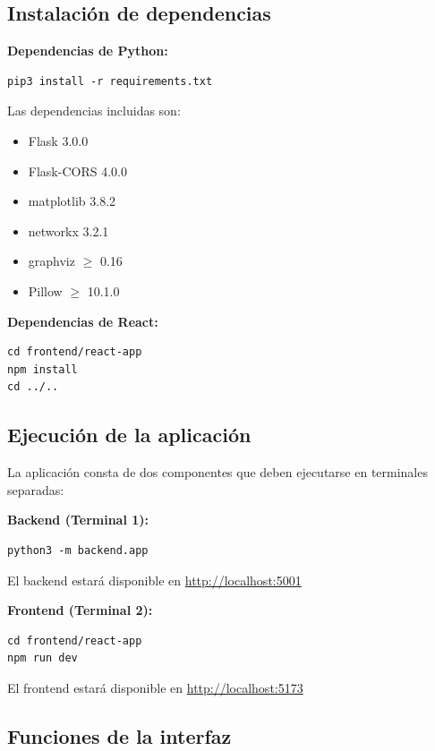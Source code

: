 \documentclass[12pt,a4paper]{article}
\begin{document}
\subsection{Instalación de dependencias}

\textbf{Dependencias de Python:}
\begin{verbatim}
pip3 install -r requirements.txt
\end{verbatim}

Las dependencias incluidas son:
\begin{itemize}
  \item Flask 3.0.0
  \item Flask-CORS 4.0.0
  \item matplotlib 3.8.2
  \item networkx 3.2.1
  \item graphviz $\geq$ 0.16
  \item Pillow $\geq$ 10.1.0
\end{itemize}

\textbf{Dependencias de React:}
\begin{verbatim}
cd frontend/react-app
npm install
cd ../..
\end{verbatim}

\subsection{Ejecución de la aplicación}

La aplicación consta de dos componentes que deben ejecutarse en terminales separadas:

\textbf{Backend (Terminal 1):}
\begin{verbatim}
python3 -m backend.app
\end{verbatim}

El backend estará disponible en \url{http://localhost:5001}

\textbf{Frontend (Terminal 2):}
\begin{verbatim}
cd frontend/react-app
npm run dev
\end{verbatim}

El frontend estará disponible en \url{http://localhost:5173}

\subsection{Funciones de la interfaz}
\end{document}
